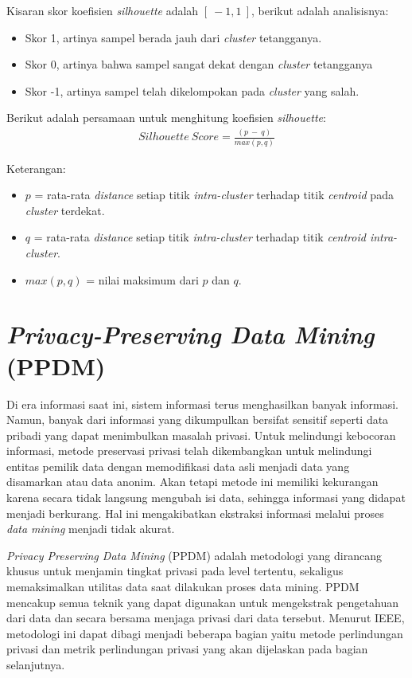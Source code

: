 \noindent Kisaran skor koefisien {\it silhouette} adalah $[\:-1, 1\:]$, berikut adalah analisisnya:
\begin{itemize}
\item Skor 1, artinya sampel berada jauh dari {\it cluster} tetangganya.
\item Skor 0, artinya bahwa sampel sangat dekat dengan {\it cluster} tetangganya
\item  Skor -1, artinya sampel telah dikelompokan pada {\it cluster} yang salah.
\end{itemize}

\vspace{0.3cm}
\noindent Berikut adalah persamaan untuk menghitung koefisien {\it silhouette}:
\begin{align}
Silhouette\:Score = \frac{(p\:-\:q)}{max(p,q)}
\end{align}

\noindent Keterangan:
\begin{itemize}
\item $p$ = rata-rata {\it distance} setiap titik {\it intra-cluster} terhadap titik {\it centroid} pada {\it cluster} terdekat.
\item $q$ = rata-rata {\it distance} setiap titik {\it intra-cluster} terhadap titik {\it centroid intra-cluster}.
\item $max(p,q)$ = nilai maksimum dari $p$ dan $q$.
\end{itemize}



\section{\textit{Privacy-Preserving Data Mining} (PPDM)} 

Di era informasi saat ini, sistem informasi terus menghasilkan banyak informasi. Namun, banyak dari informasi yang dikumpulkan bersifat sensitif seperti data pribadi yang dapat menimbulkan masalah privasi. Untuk melindungi kebocoran informasi, metode preservasi privasi telah dikembangkan untuk melindungi entitas pemilik data dengan memodifikasi data asli menjadi data yang disamarkan atau data anonim. Akan tetapi metode ini memiliki kekurangan karena secara tidak langsung mengubah isi data, sehingga informasi yang didapat menjadi berkurang. Hal ini mengakibatkan ekstraksi informasi melalui proses {\it data mining} menjadi tidak akurat. 

\textit{Privacy Preserving Data Mining} (PPDM) adalah metodologi yang dirancang khusus untuk menjamin tingkat privasi pada level tertentu, sekaligus memaksimalkan  utilitas data saat dilakukan proses data mining. PPDM mencakup semua teknik yang dapat digunakan untuk mengekstrak pengetahuan dari data dan secara bersama menjaga privasi dari data tersebut. Menurut IEEE, metodologi ini dapat dibagi menjadi beberapa bagian yaitu metode perlindungan privasi dan metrik perlindungan privasi yang akan dijelaskan pada bagian selanjutnya.

